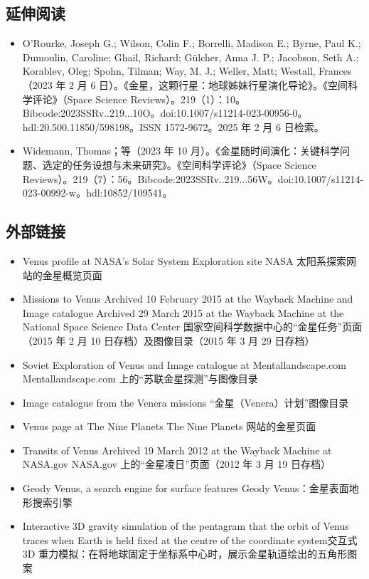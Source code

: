 \subsection{延伸阅读}
\begin{itemize}
\item O'Rourke, Joseph G.; Wilson, Colin F.; Borrelli, Madison E.; Byrne, Paul K.; Dumoulin, Caroline; Ghail, Richard; Gülcher, Anna J. P.; Jacobson, Seth A.; Korablev, Oleg; Spohn, Tilman; Way, M. J.; Weller, Matt; Westall, Frances（2023 年 2 月 6 日）。《金星，这颗行星：地球姊妹行星演化导论》。《空间科学评论》（Space Science Reviews）。219（1）：10。Bibcode:2023SSRv..219...10O。doi:10.1007/s11214-023-00956-0。hdl:20.500.11850/598198。ISSN 1572-9672。2025 年 2 月 6 日检索。
\item Widemann, Thomas；等（2023 年 10 月）。《金星随时间演化：关键科学问题、选定的任务设想与未来研究》。《空间科学评论》（Space Science Reviews）。219（7）：56。Bibcode:2023SSRv..219...56W。doi:10.1007/s11214-023-00992-w。hdl:10852/109541。
\end{itemize}
\subsection{外部链接}
\begin{itemize}
\item Venus profile at NASA's Solar System Exploration site
NASA 太阳系探索网站的金星概览页面
\item Missions to Venus Archived 10 February 2015 at the Wayback Machine and Image catalogue Archived 29 March 2015 at the Wayback Machine at the National Space Science Data Center
国家空间科学数据中心的“金星任务”页面（2015 年 2 月 10 日存档）及图像目录（2015 年 3 月 29 日存档）
\item Soviet Exploration of Venus and Image catalogue at Mentallandscape.com Mentallandscape.com 上的“苏联金星探测”与图像目录
\item Image catalogue from the Venera missions “金星（Venera）计划”图像目录

\item Venus page at The Nine Planets The Nine Planets 网站的金星页面

\item Transits of Venus Archived 19 March 2012 at the Wayback Machine at NASA.gov NASA.gov 上的“金星凌日”页面（2012 年 3 月 19 日存档）
\item Geody Venus, a search engine for surface features Geody Venus：金星表面地形搜索引擎
\item Interactive 3D gravity simulation of the pentagram that the orbit of Venus traces when Earth is held fixed at the centre of the coordinate system交互式 3D 重力模拟：在将地球固定于坐标系中心时，展示金星轨道绘出的五角形图案
\end{itemize}
